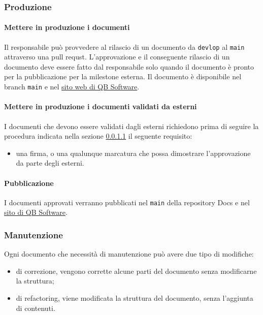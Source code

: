     \subsubsection{Produzione} 
        \paragraph{Mettere in produzione i documenti} \label{sec:doc_production}
            Il responsabile può provvedere al rilascio di un documento da \verb|devlop| al \verb|main| attraverso una pull requst. L'approvazione e il conseguente rilascio di un documento deve essere fatto dal responsabile solo quando il documento è pronto per la pubblicazione per la milestone esterna. Il documento è disponibile nel branch \verb|main| e nel \href{https://qb-software-swe.github.io/docs/}{sito web di QB Software}.
            
        \paragraph{Mettere in produzione i documenti validati da esterni} \label{sec:doc_approval_external}
        	I documenti che devono essere validati dagli esterni richiedono prima di seguire la procedura indicata nella sezione \ref{sec:doc_production} il seguente requisito:
        	\begin{itemize}
        		\item una firma, o una qualunque marcatura che possa dimostrare l'approvazione da parte degli esterni.
        	\end{itemize}

		\paragraph{Pubblicazione}
			I documenti approvati verranno pubblicati nel \verb|main| della repository Docs e nel \href{https://qb-software-swe.github.io/docs/site/index.html}{sito di QB Software}.

    \subsubsection{Manutenzione} \label{sec:doc_maintenance}
        Ogni documento che necessità di manutenzione può avere due tipo di modifiche:
        \begin{itemize}
            \item di correzione, vengono corrette alcune parti del documento senza modificarne la struttura;
            \item di refactoring, viene modificata la struttura del documento, senza l'aggiunta di contenuti.
        \end{itemize}